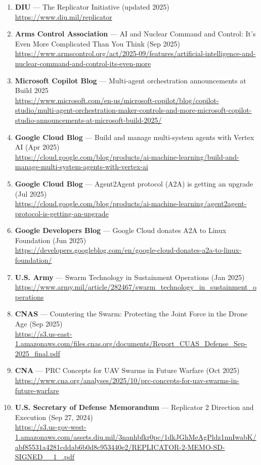 \documentclass[11pt]{article}
\begin{document}
\begin{enumerate}
\item
  \textbf{DIU} --- The Replicator Initiative (updated 2025)\\
  \url{https://www.diu.mil/replicator}
\item
  \textbf{Arms Control Association} --- AI and Nuclear Command and
  Control: It's Even More Complicated Than You Think (Sep 2025)\\
  \url{https://www.armscontrol.org/act/2025-09/features/artificial-intelligence-and-nuclear-command-and-control-its-even-more}
\item
  \textbf{Microsoft Copilot Blog} --- Multi-agent orchestration
  announcements at Build 2025\\
  \url{https://www.microsoft.com/en-us/microsoft-copilot/blog/copilot-studio/multi-agent-orchestration-maker-controls-and-more-microsoft-copilot-studio-announcements-at-microsoft-build-2025/}
\item
  \textbf{Google Cloud Blog} --- Build and manage multi-system agents
  with Vertex AI (Apr 2025)\\
  \url{https://cloud.google.com/blog/products/ai-machine-learning/build-and-manage-multi-system-agents-with-vertex-ai}
\item
  \textbf{Google Cloud Blog} --- Agent2Agent protocol (A2A) is getting
  an upgrade (Jul 2025)\\
  \url{https://cloud.google.com/blog/products/ai-machine-learning/agent2agent-protocol-is-getting-an-upgrade}
\item
  \textbf{Google Developers Blog} --- Google Cloud donates A2A to Linux
  Foundation (Jun 2025)\\
  \url{https://developers.googleblog.com/en/google-cloud-donates-a2a-to-linux-foundation/}
\item
  \textbf{U.S. Army} --- Swarm Technology in Sustainment Operations (Jan
  2025)\\
  \url{https://www.army.mil/article/282467/swarm_technology_in_sustainment_operations}
\item
  \textbf{CNAS} --- Countering the Swarm: Protecting the Joint Force in
  the Drone Age (Sep 2025)\\
  \url{https://s3.us-east-1.amazonaws.com/files.cnas.org/documents/Report_CUAS_Defense_Sep-2025_final.pdf}
\item
  \textbf{CNA} --- PRC Concepts for UAV Swarms in Future Warfare (Oct
  2025)\\
  \url{https://www.cna.org/analyses/2025/10/prc-concepts-for-uav-swarms-in-future-warfare}
\item
  \textbf{U.S. Secretary of Defense Memorandum} --- Replicator 2
  Direction and Execution (Sep 27, 2024)\\
  \url{https://s3.us-gov-west-1.amazonaws.com/assets.diu.mil/3nanhbfkr0pc/1dkJGhMeAgPldz1nnIwabK/abf85531a4281cddab6b0d8c953440e2/REPLICATOR-2-MEMO-SD-SIGNED__1_.pdf}
\end{enumerate}
\end{document}
